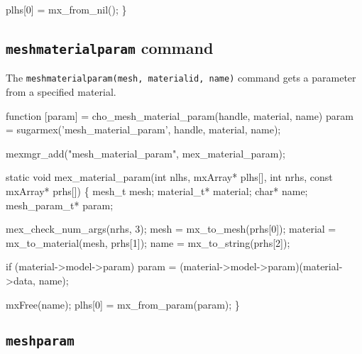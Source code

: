     plhs[0] = mx_from_nil();
\}

\nwendcode{}\nwdocspar



\subsection{{\tt{}mesh{}material{}param} command}

The {\tt{}mesh{}material{}param(mesh,\ material{}id,\ name)} command gets a
parameter from a specified material.

\nwenddocs{}\endmoddef
function [param] = cho_mesh_material_param(handle, material, name)
param = sugarmex('mesh_material_param', handle, material, name);
\nwendcode{}\nwdocspar

\nwenddocs{}\plusendmoddef
mexmgr_add("mesh_material_param", mex_material_param);
\nwendcode{}\nwdocspar

\nwenddocs{}\plusendmoddef
static void mex_material_param(int nlhs, mxArray* plhs[],
                               int nrhs, const mxArray* prhs[])
\{
    mesh_t        mesh;
    material_t*   material;
    char*         name;
    mesh_param_t* param;

    mex_check_num_args(nrhs, 3);
    mesh     = mx_to_mesh(prhs[0]);
    material = mx_to_material(mesh, prhs[1]);
    name     = mx_to_string(prhs[2]);

    if (material->model->param)
        param = (material->model->param)(material->data, name);

    mxFree(name);
    plhs[0] = mx_from_param(param);
\}

\nwendcode{}\nwdocspar


\subsection{{\tt{}mesh{}param}}

